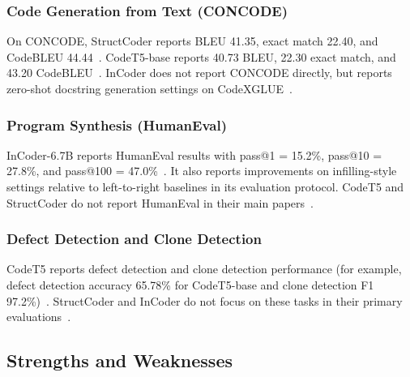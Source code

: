 \documentclass[12pt]{article}
\begin{document}
\subsubsection{Code Generation from Text (CONCODE)}

On CONCODE, StructCoder reports BLEU 41.35, exact match 22.40, and CodeBLEU 44.44~\cite{10.1145/3636430}. CodeT5-base reports 40.73 BLEU, 22.30 exact match, and 43.20 CodeBLEU~\cite{wang-etal-2021-codet5}. InCoder does not report CONCODE directly, but reports zero-shot docstring generation settings on CodeXGLUE~\cite{fried2023incodergenerativemodelcode}.

\subsubsection{Program Synthesis (HumanEval)}

InCoder-6.7B reports HumanEval results with pass@1 = 15.2\%, pass@10 = 27.8\%, and pass@100 = 47.0\%~\cite{fried2023incodergenerativemodelcode}. It also reports improvements on infilling-style settings relative to left-to-right baselines in its evaluation protocol. CodeT5 and StructCoder do not report HumanEval in their main papers~\cite{wang-etal-2021-codet5,10.1145/3636430}.

\subsubsection{Defect Detection and Clone Detection}

CodeT5 reports defect detection and clone detection performance (for example, defect detection accuracy 65.78\% for CodeT5-base and clone detection F1 97.2\%)~\cite{wang-etal-2021-codet5}. StructCoder and InCoder do not focus on these tasks in their primary evaluations~\cite{10.1145/3636430,fried2023incodergenerativemodelcode}.

\subsection{Strengths and Weaknesses}
\end{document}
